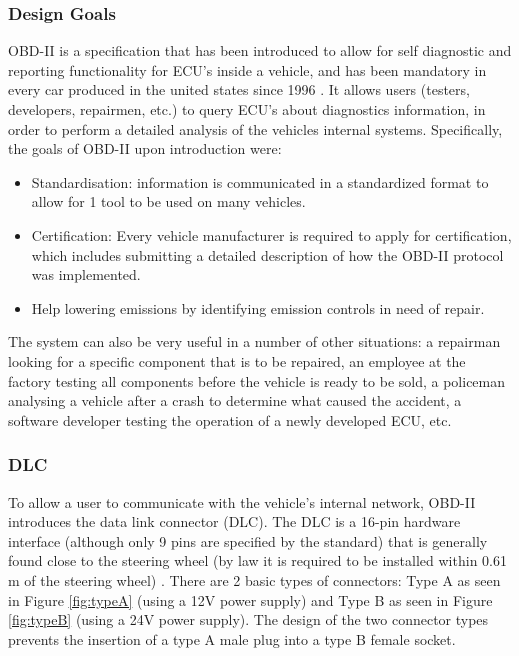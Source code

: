 \subsubsection{Design Goals} 
\label{subsec:obd:design_goal}

OBD-II is a specification that has been introduced to allow for self diagnostic and reporting functionality for ECU's inside a vehicle, and has been mandatory in every car produced in the united states since 1996 \cite{wiki:OBD}. It allows users (testers, developers, repairmen, etc.) to query ECU's about diagnostics information, in order to perform a detailed analysis of the vehicles internal systems. Specifically, the goals of OBD-II upon introduction were: 
\begin{itemize}
	\item Standardisation: information is communicated in a standardized format to allow for 1 tool to be used on many vehicles.
	\item Certification: Every vehicle manufacturer is required to apply for certification, which includes submitting a detailed description of how the OBD-II protocol was implemented.
	\item Help lowering emissions by identifying emission controls in need of repair.
\end{itemize} 
The system can also be very useful in a number of other situations: a repairman looking for a specific component that is to be repaired, an employee at the factory testing all components before the vehicle is ready to be sold, a policeman analysing a vehicle after a crash to determine what caused the accident, a software developer testing the operation of a newly developed ECU, etc. 

\subsubsection{DLC}
\label{subsec:obd:dlc}

To allow a user to communicate with the vehicle's internal network, OBD-II introduces the data link connector (DLC). The DLC is a 16-pin hardware interface (although only 9 pins are specified by the standard) that is generally found close to the steering wheel (by law it is required to be installed within 0.61 m of the steering wheel) \cite{wiki:OBD}. There are 2 basic types of connectors: Type A as seen in Figure \ref{fig:typeA} (using a 12V power supply) and Type B as seen in Figure \ref{fig:typeB} (using a 24V power supply). The design of the two connector types prevents the insertion of a type A male plug into a type B female socket.

